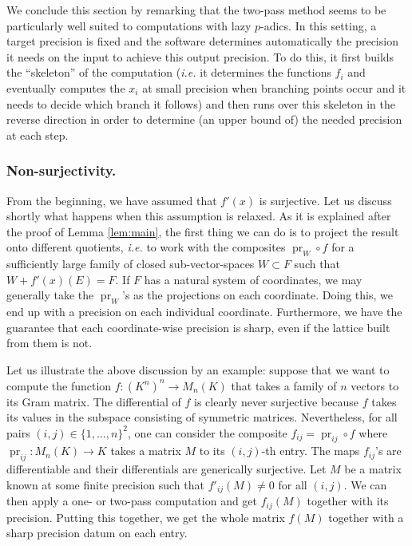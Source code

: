 \documentclass{lms}
\DeclareMathOperator{\pr}{pr}
\begin{document}
We conclude this section by remarking that the two-pass method seems 
to be particularly well suited to computations with lazy $p$-adics.
In this setting, a target precision is fixed and the software determines automatically the precision 
it needs on the input to achieve this output precision. To do this, it first 
builds the ``skeleton'' of the computation (\emph{i.e.} it determines the 
functions $f_i$ and eventually computes the $x_i$ at small precision when 
branching points occur and it needs to decide which branch it follows) 
and then runs over this skeleton in the reverse direction in order to 
determine (an upper bound of) the needed precision at each step.

\subsubsection*{Non-surjectivity.}

From the beginning, we have assumed that $f'(x)$ is surjective. Let us 
discuss shortly what happens when this assumption is relaxed. As it is 
explained after the proof of Lemma \ref{lem:main}, the first thing we 
can do is to project the result onto different quotients, \emph{i.e.} to 
work with the composites $\pr_W \circ f$ for a sufficiently large family 
of closed sub-vector-spaces $W \subset F$ such that $W + f'(x)(E) = F$. 
If $F$ has a natural system of coordinates, we may generally take the 
$\pr_W$'s as the projections on each coordinate. Doing this, we end up 
with a precision on each individual coordinate. Furthermore, we have the 
guarantee that each coordinate-wise precision is sharp, even if the lattice built
from them is not.

Let us illustrate the above discussion by an example: suppose that we 
want to compute the function $f : (K^n)^n \to M_n(K)$ that takes a 
family of $n$ vectors to its Gram matrix. The differential of $f$ is
clearly never surjective because $f$ takes its values in the subspace
consisting of symmetric matrices. Nevertheless, for all pairs $(i,j)
\in \{1, \ldots, n\}^2$, one can consider the composite $f_{ij} = 
\pr_{ij} \circ f$ where $\pr_{ij} : M_n(K) \to K$ takes a matrix 
$M$ to its $(i,j)$-th entry. The maps $f_{ij}$'s are differentiable and 
their differentials are generically surjective. Let $M$ be a matrix known
at some finite precision such that 
$f'_{ij} (M) \neq 0$ for all $(i,j)$. We can then apply a one- or two-pass 
computation and get $f_{ij}(M)$ together with its 
precision. Putting this together, we get the whole matrix $f(M)$ 
together with a sharp precision datum on each entry.
\end{document}
